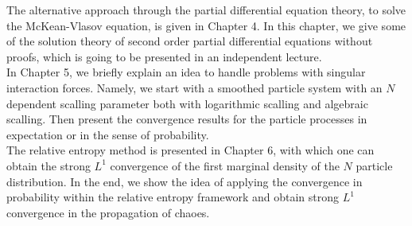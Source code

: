The alternative approach through the partial differential equation theory, to solve the McKean-Vlasov equation, is given in Chapter 4. In this chapter, we give some of the solution theory of second order partial differential equations without proofs, which is going to be presented in an independent lecture.\\[1ex]
In Chapter 5, we briefly explain an idea to handle problems with singular interaction forces. Namely, we start with a smoothed particle system with an $N$ dependent scalling parameter both with logarithmic scalling and algebraic scalling. Then present the convergence results for the particle processes in expectation or in the sense of probability. \\[1ex]
The relative entropy method is presented in Chapter 6, with which one can obtain the strong $L^1$ convergence of the first marginal density of the $N$ particle distribution. In the end, we show the idea of applying the convergence in probability within the relative entropy framework and obtain strong $L^1$ convergence in the propagation of chaoes. \\[1ex]


